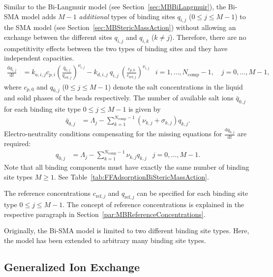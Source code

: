 Similar to the Bi-Langmuir model (see Section~\ref{sec:MBBiLangmuir}), the Bi-SMA model adds $M - 1$ \emph{additional} types of binding sites $q_{i,j}$ ($0 \leq j \leq M - 1$) to the SMA model (see Section~\ref{sec:MBStericMassAction}) without allowing an exchange between the different sites $q_{i,j}$ and $q_{i,k}$ ($k \neq j$). 
Therefore, there are no competitivity effects between the two types of binding sites and they have independent capacities.
\begin{align*}
  \frac{\mathrm{d} q_{i,j}}{\mathrm{d} t} &= k_{a,i,j} c_{p,i} \left(\frac{\bar{q}_{0,j}}{q_{\text{ref},j}} \right)^{\nu_{i,j}} - k_{d,i,j}\: q_{i,j}\: \left(\frac{c_{p,0}}{c_{\text{ref},j}}\right)^{\nu_{i,j}} & i = 1, \dots, N_{\text{comp}} - 1, \quad j = 0, \dots, M - 1,
\end{align*}
where $c_{p,0}$ and $q_{0,j}$ ($0 \leq j \leq M - 1$) denote the salt concentrations in the liquid and solid phases of the beads respectively. The number of available salt ions $\bar{q}_{0,j}$ for each binding site type $0 \leq j \leq M - 1$ is given by
\begin{align*}
  \bar{q}_{0,j} &= \Lambda_j - \sum_{k=1}^{N_{\text{comp}} - 1} \left( \nu_{k,j} + \sigma_{k,j} \right) q_{k,j}.
\end{align*}
Electro-neutrality conditions compensating for the missing equations for $\frac{\mathrm{d} q_{0,j}}{\mathrm{d}t}$ are required:
\begin{align*}
  q_{0,j} &= \Lambda_j - \sum_{k=1}^{N_{\text{comp}} - 1} \nu_{k,j} q_{k,j} & j = 0, \dots, M - 1.
\end{align*}
Note that all binding components must have exactly the same number of binding site types $M \geq 1$.
See Table~\ref{tab:FFAdsorptionBiStericMassAction}.

The reference concentrations $c_{\text{ref},j}$ and $q_{\text{ref},j}$ can be specified for each binding site type $0 \leq j \leq M - 1$.
The concept of reference concentrations is explained in the respective paragraph in Section~\ref{par:MBReferenceConcentrations}.

Originally, the Bi-SMA model is limited to two different binding site types.
Here, the model has been extended to arbitrary many binding site types.

\subsection{Generalized Ion Exchange}\label{sec:MBGeneralizedIonExchange}

